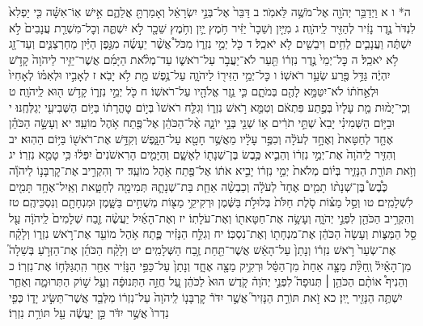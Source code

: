 \documentclass[twoside, openany, parskip=half, 11pt]{book}
\begin{document}
ה* ו א וַיְדַבֵּ֥ר יְהֹוָ֖ה אֶל־מֹשֶׁ֥ה לֵּאמֹֽר׃ ב דַּבֵּר֙ אֶל־בְּנֵ֣י יִשְׂרָאֵ֔ל וְאָמַרְתָּ֖ אֲלֵהֶ֑ם אִ֣ישׁ אֽוֹ־אִשָּׁ֗ה כִּ֤י יַפְלִא֙ לִנְדֹּר֙ נֶ֣דֶר נָזִ֔יר לְהַזִּ֖יר לַֽיהֹוָֽה׃ ג מִיַּ֤יִן וְשֵׁכָר֙ יַזִּ֔יר חֹ֥מֶץ יַ֛יִן וְחֹ֥מֶץ שֵׁכָ֖ר לֹ֣א יִשְׁתֶּ֑ה וְכׇל־מִשְׁרַ֤ת עֲנָבִים֙ לֹ֣א יִשְׁתֶּ֔ה וַעֲנָבִ֛ים לַחִ֥ים וִיבֵשִׁ֖ים לֹ֥א יֹאכֵֽל׃ ד כֹּ֖ל יְמֵ֣י נִזְר֑וֹ מִכֹּל֩ אֲשֶׁ֨ר יֵעָשֶׂ֜ה מִגֶּ֣פֶן הַיַּ֗יִן מֵחַרְצַנִּ֛ים וְעַד־זָ֖ג לֹ֥א יֹאכֵֽל׃ ה כׇּל־יְמֵי֙ נֶ֣דֶר נִזְר֔וֹ תַּ֖עַר לֹא־יַעֲבֹ֣ר עַל־רֹאשׁ֑וֹ עַד־מְלֹ֨את הַיָּמִ֜ם אֲשֶׁר־יַזִּ֤יר לַיהֹוָה֙ קָדֹ֣שׁ יִהְיֶ֔ה גַּדֵּ֥ל פֶּ֖רַע שְׂעַ֥ר רֹאשֽׁוֹ׃ ו כׇּל־יְמֵ֥י הַזִּיר֖וֹ לַיהֹוָ֑ה עַל־נֶ֥פֶשׁ מֵ֖ת לֹ֥א יָבֹֽא׃ ז לְאָבִ֣יו וּלְאִמּ֗וֹ לְאָחִיו֙ וּלְאַ֣חֹת֔וֹ לֹא־יִטַּמָּ֥א לָהֶ֖ם בְּמֹתָ֑ם כִּ֛י נֵ֥זֶר אֱלֹהָ֖יו עַל־רֹאשֽׁוֹ׃ ח כֹּ֖ל יְמֵ֣י נִזְר֑וֹ קָדֹ֥שׁ ה֖וּא לַֽיהֹוָֽה׃ ט וְכִֽי־יָמ֨וּת מֵ֤ת עָלָיו֙ בְּפֶ֣תַע פִּתְאֹ֔ם וְטִמֵּ֖א רֹ֣אשׁ נִזְר֑וֹ וְגִלַּ֤ח רֹאשׁוֹ֙ בְּי֣וֹם טׇהֳרָת֔וֹ בַּיּ֥וֹם הַשְּׁבִיעִ֖י יְגַלְּחֶֽנּוּ׃ י וּבַיּ֣וֹם הַשְּׁמִינִ֗י יָבִא֙ שְׁתֵּ֣י תֹרִ֔ים א֥וֹ שְׁנֵ֖י בְּנֵ֣י יוֹנָ֑ה אֶ֨ל־הַכֹּהֵ֔ן אֶל־פֶּ֖תַח אֹ֥הֶל מוֹעֵֽד׃ יא וְעָשָׂ֣ה הַכֹּהֵ֗ן אֶחָ֤ד לְחַטָּאת֙ וְאֶחָ֣ד לְעֹלָ֔ה וְכִפֶּ֣ר עָלָ֔יו מֵאֲשֶׁ֥ר חָטָ֖א עַל־הַנָּ֑פֶשׁ וְקִדַּ֥שׁ אֶת־רֹאשׁ֖וֹ בַּיּ֥וֹם הַהֽוּא׃ יב וְהִזִּ֤יר לַֽיהֹוָה֙ אֶת־יְמֵ֣י נִזְר֔וֹ וְהֵבִ֛יא כֶּ֥בֶשׂ בֶּן־שְׁנָת֖וֹ לְאָשָׁ֑ם וְהַיָּמִ֤ים הָרִאשֹׁנִים֙ יִפְּל֔וּ כִּ֥י טָמֵ֖א נִזְרֽוֹ׃ יג וְזֹ֥את תּוֹרַ֖ת הַנָּזִ֑יר בְּי֗וֹם מְלֹאת֙ יְמֵ֣י נִזְר֔וֹ יָבִ֣יא אֹת֔וֹ אֶל־פֶּ֖תַח אֹ֥הֶל מוֹעֵֽד׃ יד וְהִקְרִ֣יב אֶת־קׇרְבָּנ֣וֹ לַיהֹוָ֡ה כֶּ֩בֶשׂ֩ בֶּן־שְׁנָת֨וֹ תָמִ֤ים אֶחָד֙ לְעֹלָ֔ה וְכַבְשָׂ֨ה אַחַ֧ת בַּת־שְׁנָתָ֛הּ תְּמִימָ֖ה לְחַטָּ֑את וְאַֽיִל־אֶחָ֥ד תָּמִ֖ים לִשְׁלָמִֽים׃ טו וְסַ֣ל מַצּ֗וֹת סֹ֤לֶת חַלֹּת֙ בְּלוּלֹ֣ת בַּשֶּׁ֔מֶן וּרְקִיקֵ֥י מַצּ֖וֹת מְשֻׁחִ֣ים בַּשָּׁ֑מֶן וּמִנְחָתָ֖ם וְנִסְכֵּיהֶֽם׃ טז וְהִקְרִ֥יב הַכֹּהֵ֖ן לִפְנֵ֣י יְהֹוָ֑ה וְעָשָׂ֥ה אֶת־חַטָּאת֖וֹ וְאֶת־עֹלָתֽוֹ׃ יז וְאֶת־הָאַ֜יִל יַעֲשֶׂ֨ה זֶ֤בַח שְׁלָמִים֙ לַֽיהֹוָ֔ה עַ֖ל סַ֣ל הַמַּצּ֑וֹת וְעָשָׂה֙ הַכֹּהֵ֔ן אֶת־מִנְחָת֖וֹ וְאֶת־נִסְכּֽוֹ׃ יח וְגִלַּ֣ח הַנָּזִ֗יר פֶּ֛תַח אֹ֥הֶל מוֹעֵ֖ד אֶת־רֹ֣אשׁ נִזְר֑וֹ וְלָקַ֗ח אֶת־שְׂעַר֙ רֹ֣אשׁ נִזְר֔וֹ וְנָתַן֙ עַל־הָאֵ֔שׁ אֲשֶׁר־תַּ֖חַת זֶ֥בַח הַשְּׁלָמִֽים׃ יט וְלָקַ֨ח הַכֹּהֵ֜ן אֶת־הַזְּרֹ֣עַ בְּשֵׁלָה֮ מִן־הָאַ֒יִל֒ וְֽחַלַּ֨ת מַצָּ֤ה אַחַת֙ מִן־הַסַּ֔ל וּרְקִ֥יק מַצָּ֖ה אֶחָ֑ד וְנָתַן֙ עַל־כַּפֵּ֣י הַנָּזִ֔יר אַחַ֖ר הִֽתְגַּלְּח֥וֹ אֶת־נִזְרֽוֹ׃ כ וְהֵנִיף֩ אוֹתָ֨ם הַכֹּהֵ֥ן ׀ תְּנוּפָה֮ לִפְנֵ֣י יְהֹוָה֒ קֹ֤דֶשׁ הוּא֙ לַכֹּהֵ֔ן עַ֚ל חֲזֵ֣ה הַתְּנוּפָ֔ה וְעַ֖ל שׁ֣וֹק הַתְּרוּמָ֑ה וְאַחַ֛ר יִשְׁתֶּ֥ה הַנָּזִ֖יר יָֽיִן׃ כא זֹ֣את תּוֹרַ֣ת הַנָּזִיר֮ אֲשֶׁ֣ר יִדֹּר֒ קׇרְבָּנ֤וֹ לַֽיהֹוָה֙ עַל־נִזְר֔וֹ מִלְּבַ֖ד אֲשֶׁר־תַּשִּׂ֣יג יָד֑וֹ כְּפִ֤י נִדְרוֹ֙ אֲשֶׁ֣ר יִדֹּ֔ר כֵּ֣ן יַעֲשֶׂ֔ה עַ֖ל תּוֹרַ֥ת נִזְרֽוֹ׃
\end{document}
